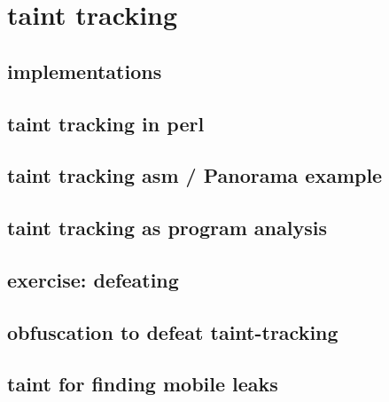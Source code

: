 \section{taint tracking}


\subsection{implementations}


\subsection{taint tracking in perl}


\subsection{taint tracking asm / Panorama example}


\subsection{taint tracking as program analysis}

\subsection{exercise: defeating} 


\subsection{obfuscation to defeat taint-tracking}


\subsection{taint for finding mobile leaks}


